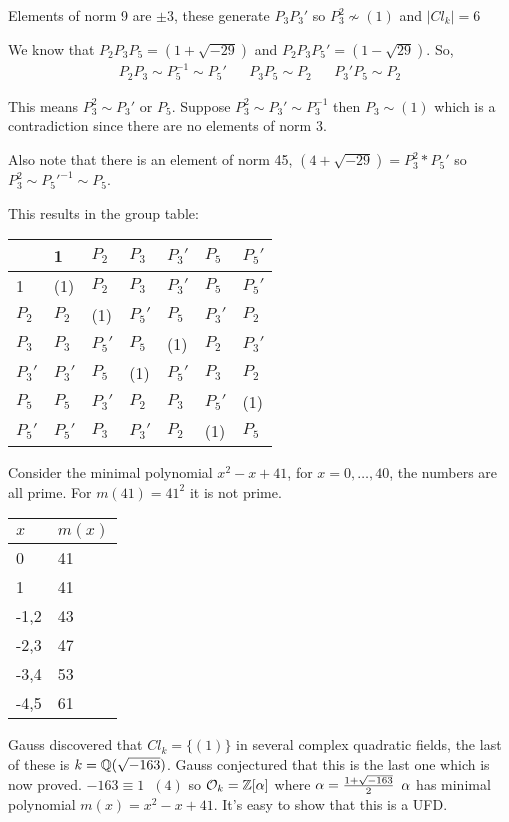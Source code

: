 \documentclass[11pt]{article}
\begin{document}
Elements of norm 9 are $\pm 3$, these generate $P_3P_3'$ so $P_3^2 \not \sim (1) $ and $|Cl_k| = 6$
\spa

We know that $P_2P_3P_5 = (1+ \sqrt{-29})$ and $P_2P_3P_5' = (1-\sqrt{29})$. So,
\begin{align*}
	P_2P_3 \sim P_5^{-1} \sim P_5' && P_3P_5\sim P_2 && P_3'P_5 \sim P_2
\end{align*}

This means $P_3^2 \sim P_3'$ or $P_5$.
Suppose $P_3^2 \sim P_3' \sim P_3^{-1}$ then $P_3 \sim (1)$ which is a contradiction since there are no elements of norm 3.
\spa

Also note that there is an element of norm 45, $(4 + \sqrt{-29}) = P_3^2 * P_5'$ so $P_3^2 \sim P_5'^{-1} \sim P_5$.
\spac


This results in the group table: 
\begin{tabular}{|l|llllll|}
	\hline
	       & 1      & $P_2$  & $P_3$  & $P_3'$ & $P_5$  & $P_5'$ \\ \hline
	       1      & (1)    & $P_2$  & $P_3$  & $P_3'$ & $P_5$  & $P_5'$ \\
	       $P_2$  & $P_2$  & (1)    & $P_5'$ & $P_5$  & $P_3'$ & $P_2$  \\
	       $P_3$  & $P_3$  & $P_5'$ & $P_5$  & (1)    & $P_2$  & $P_3'$ \\
	       $P_3'$ & $P_3'$ & $P_5$  & (1)    & $P_5'$ & $P_3$  & $P_2$  \\
	       $P_5$  & $P_5$  & $P_3'$ & $P_2$  & $P_3$  & $P_5'$ & (1)    \\
	       $P_5'$ & $P_5'$ & $P_3$  & $P_3'$ & $P_2$  & (1)    & $P_5$ \\ \hline
\end{tabular}

\spac
\spac
Consider the minimal polynomial $x^2 - x+41 $, for $x = 0, \dots, 40$, the numbers are all prime. For $m(41) = 41^2$ it is not prime.

\begin{tabular}{|l|l|}
	\hline
	$x$  & $m(x)$ \\ \hline
	0    & 41     \\
	1    & 41     \\
	-1,2 & 43     \\
	-2,3 & 47     \\
	-3,4 & 53     \\ 
	-4,5 & 61    \\ \hline
\end{tabular}

\spac
Gauss discovered that $Cl_k = \{(1)\} $ in several complex quadratic fields, the last of these is $k = \mathbb{Q}(\sqrt{-163})$.
\spac
Gauss conjectured that this is the last one which is now proved.
\spac
$-163 \equiv 1 \hspace{7pt} (4) $ so $\mathcal{O}_k = \mathbb{Z}[\alpha] $ where $\alpha = \frac{1+\sqrt{-163}}2$
\spac
$\alpha$ has minimal polynomial $m(x) = x^2 - x+41$.
It's easy to show that this is a UFD.
\end{document}
